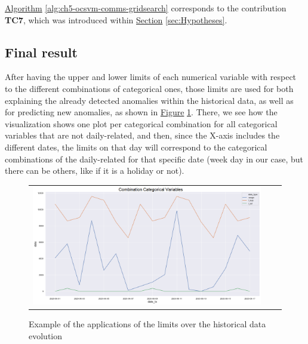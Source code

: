 \hyperref[alg:ch5-ocsvm-comms-gridsearch]{Algorithm} \ref{alg:ch5-ocsvm-comms-gridsearch} corresponds to the contribution \textbf{TC7}, which was introduced within \hyperref[sec:Hypotheses]{Section} \ref{sec:Hypotheses}.

\pagebreak

\subsection{Final result}\label{subsec:ch5-finalresult}



After having the upper and lower limits of each numerical variable with respect to the different combinations of categorical ones, those limits are used for both explaining the already detected anomalies within the historical data, as well as for predicting new anomalies, as shown in \hyperref[fig:ch5-comms-anomalies-viz]{Figure} \ref{fig:ch5-comms-anomalies-viz}. There, we see how the visualization shows one plot per categorical combination for all categorical variables that are not daily-related, and then, since the X-axis includes the different dates, the limits on that day will correspond to the categorical combinations of the daily-related for that specific date (week day in our case, but there can be others, like if it is a holiday or not).

\begin{figure}[h!]
\centering
  \begin{tabular}{c@{\qquad}c@{\qquad}c}
\includegraphics[width=0.9\columnwidth]{figures/chapter5_LucaComms/ThresholdsResults.png}
  \end{tabular} 
  \caption{Example of the applications of the limits over the historical data evolution \label{fig:ch5-comms-anomalies-viz}}
\end{figure}

